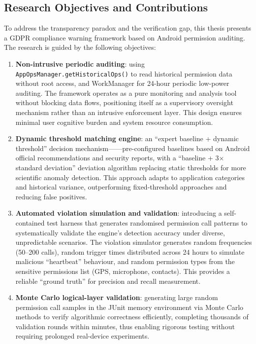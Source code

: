 \subsection{Research Objectives and Contributions}

To address the transparency paradox and the verification gap, this thesis presents a GDPR compliance warning framework based on Android permission auditing. The research is guided by the following objectives:

\begin{enumerate}
\item \textbf{Non-intrusive periodic auditing}: using \texttt{AppOpsManager.getHistoricalOps()} to read historical permission data without root access, and WorkManager for 24-hour periodic low-power auditing. The framework operates as a pure monitoring and analysis tool without blocking data flows, positioning itself as a supervisory oversight mechanism rather than an intrusive enforcement layer. This design ensures minimal user cognitive burden and system resource consumption.
\item \textbf{Dynamic threshold matching engine}: an ``expert baseline + dynamic threshold'' decision mechanism——pre-configured baselines based on Android official recommendations and security reports, with a ``baseline + 3× standard deviation'' deviation algorithm replacing static thresholds for more scientific anomaly detection. This approach adapts to application categories and historical variance, outperforming fixed-threshold approaches and reducing false positives.
\item \textbf{Automated violation simulation and validation}: introducing a self-contained test harness that generates randomised permission call patterns to systematically validate the engine's detection accuracy under diverse, unpredictable scenarios. The violation simulator generates random frequencies (50--200 calls), random trigger times distributed across 24 hours to simulate malicious ``heartbeat'' behaviour, and random permission types from the sensitive permissions list (GPS, microphone, contacts). This provides a reliable ``ground truth'' for precision and recall measurement.
\item \textbf{Monte Carlo logical-layer validation}: generating large random permission call samples in the JUnit memory environment via Monte Carlo methods to verify algorithmic correctness efficiently, completing thousands of validation rounds within minutes, thus enabling rigorous testing without requiring prolonged real-device experiments.
\end{enumerate}


